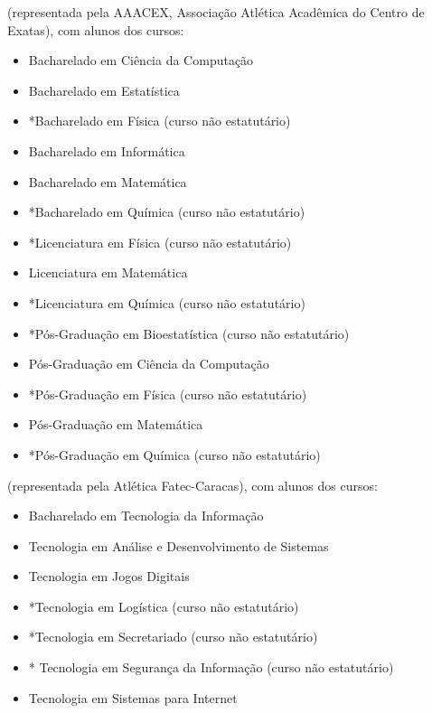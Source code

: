 \begin{article}
\begin{description}[noitemsep]
		\item[UEM] (representada pela AAACEX, Associação Atlética Acadêmica do Centro de Exatas), com alunos dos cursos:
		\begin{itemize}[noitemsep]
			\item Bacharelado em Ciência da Computação
			\item Bacharelado em Estatística
			\item *Bacharelado em Física (curso não estatutário)
			\item Bacharelado em Informática
			\item Bacharelado em Matemática
			\item *Bacharelado em Química (curso não estatutário)
			\item *Licenciatura em Física (curso não estatutário)
			\item Licenciatura em Matemática
			\item *Licenciatura em Química (curso não estatutário)
			\item *Pós-Graduação em Bioestatística (curso não estatutário)
			\item Pós-Graduação em Ciência da Computação
			\item *Pós-Graduação em Física (curso não estatutário)
			\item Pós-Graduação em Matemática
			\item *Pós-Graduação em Química (curso não estatutário)
		\end{itemize}

		\item[Faculdade de Tecnologia - Carapicuíba] (representada pela Atlética Fatec-Caracas), com alunos dos cursos:
		\begin{itemize}[noitemsep]
			\item Bacharelado em Tecnologia da Informação
			\item Tecnologia em Análise e Desenvolvimento de Sistemas
			\item Tecnologia em Jogos Digitais
			\item *Tecnologia em Logística (curso não estatutário)
			\item *Tecnologia em Secretariado (curso não estatutário)
			\item * Tecnologia em Segurança da Informação (curso não estatutário)
			\item Tecnologia em Sistemas para Internet
		\end{itemize}


\end{description}
\end{article}
